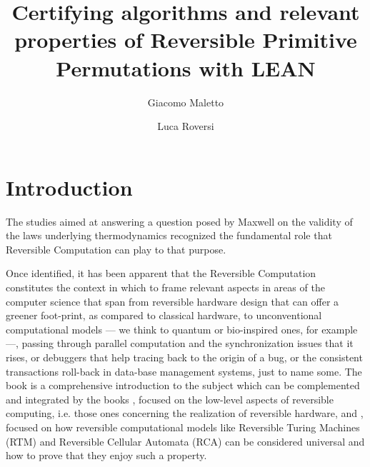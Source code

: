\documentclass[runningheads]{llncs}
\newcommand{\LEAN}{\textsf{LEAN}\xspace}
\begin{document}
\title{Certifying algorithms and relevant properties of  Reversible Primitive Permutations with \LEAN}

\author{Giacomo Maletto \and
	    Luca Roversi}



\maketitle
\begin{abstract}
\end{abstract}

\section{Introduction}
\label{section:Introduction}

The studies aimed at answering a question posed by Maxwell on the validity of the laws underlying thermodynamics recognized the fundamental role that Reversible Computation can play to that purpose.

Once identified, it has been apparent that the Reversible Computation constitutes the context in which to frame relevant aspects in areas of the computer science that span from reversible hardware design that can offer a greener foot-print, as compared to classical hardware, to unconventional computational models --- we think to quantum or bio-inspired ones, for example ---, passing through parallel computation and the synchronization issues that it rises, or debuggers that help tracing back to the origin of a bug, or the consistent transactions roll-back in data-base management systems, just to name some. The book \cite{perumalla2013chc} is a comprehensive introduction to the subject which can be complemented and integrated by the books \cite{DBLP:books/daglib/0025734}, focused on the low-level aspects of reversible computing, i.e. those ones concerning the realization of reversible hardware, and
\cite{DBLP:series/eatcs/Morita17}, focused on how reversible computational models like Reversible Turing Machines (RTM) and Reversible Cellular Automata (RCA) can be considered universal and how to prove that they enjoy such a property.
\end{document}
